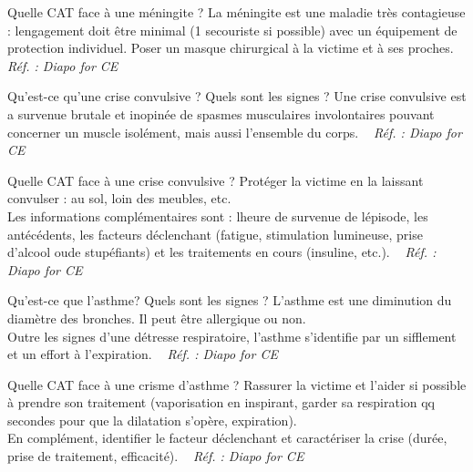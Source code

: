 \documentclass[grid,avery5371,landscape]{flashcards}
\makeatletter
\newcounter{nocarte}
\newcommand{\categ}[1]{%
  \def\@categ{#1}%
  \setcounter{nocarte}{0}%
}
\newcommand{\source}[1]{%
  \medskip
  \itshape%
   ~ \hfill Réf. : #1}
\makeatother
\begin{document}
\color[HTML]{01DF01}
\categ{CE-CP-REG}
\begin{flashcard}[CAT]{
 Quelle CAT face à une méningite ?   }
  La méningite est une maladie très contagieuse : lengagement doit être minimal (1 secouriste si possible) avec un équipement de protection individuel. Poser un masque chirurgical à la victime et à ses proches. 
  \source{Diapo for CE }
\end{flashcard}


\color[HTML]{01DF01}
\categ{CE-CP-REG}
\begin{flashcard}[bilan]{
 Qu'est-ce qu'une crise convulsive ? Quels sont les signes ?   }
  Une crise convulsive est a survenue brutale et inopinée de spasmes musculaires involontaires pouvant concerner un muscle isolément, mais aussi l'ensemble du corps.
  \source{Diapo for CE }
\end{flashcard}


\color[HTML]{01DF01}
\categ{CE-CP-REG}
\begin{flashcard}[CAT]{
 Quelle CAT face à une crise convulsive ?   }
  Protéger la victime en la laissant convulser : au sol, loin des meubles, etc. \\
Les informations complémentaires sont : lheure de survenue de lépisode, les antécédents, les facteurs déclenchant (fatigue, stimulation lumineuse, prise d'alcool oude stupéfiants) et les traitements en cours (insuline, etc.).
  \source{Diapo for CE }
\end{flashcard}


\color[HTML]{01DF01}
\categ{CE-CP-REG}
\begin{flashcard}[bilan]{
 Qu'est-ce que l'asthme? Quels sont les signes ?   }
  L'asthme est une diminution du diamètre des bronches. Il peut être allergique ou non.  \\
    Outre les signes d'une détresse respiratoire, l'asthme s'identifie par un sifflement et un effort à l'expiration.
  \source{Diapo for CE }
\end{flashcard}


\color[HTML]{01DF01}
\categ{CE-CP-REG}
\begin{flashcard}[CAT]{
 Quelle CAT face à une crisme d'asthme ?   }
  Rassurer la victime et l'aider si possible à prendre son traitement (vaporisation en inspirant, garder sa respiration qq secondes pour que la dilatation s'opère, expiration).
 \\
    En complément, identifier le facteur déclenchant et caractériser la crise (durée, prise de traitement, efficacité).
  \source{Diapo for CE }
\end{flashcard}
\end{document}
